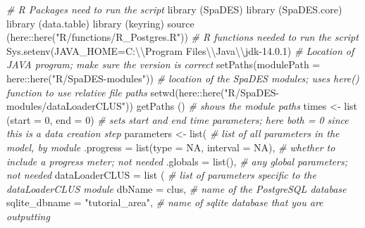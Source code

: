 \documentclass[
]{article}
\newenvironment{Shaded}{\begin{snugshade}}{\end{snugshade}}
\newcommand{\AttributeTok}[1]{\textcolor[rgb]{0.77,0.63,0.00}{#1}}
\newcommand{\CommentTok}[1]{\textcolor[rgb]{0.56,0.35,0.01}{\textit{#1}}}
\newcommand{\ConstantTok}[1]{\textcolor[rgb]{0.00,0.00,0.00}{#1}}
\newcommand{\DecValTok}[1]{\textcolor[rgb]{0.00,0.00,0.81}{#1}}
\newcommand{\FunctionTok}[1]{\textcolor[rgb]{0.00,0.00,0.00}{#1}}
\newcommand{\NormalTok}[1]{#1}
\newcommand{\OtherTok}[1]{\textcolor[rgb]{0.56,0.35,0.01}{#1}}
\newcommand{\SpecialCharTok}[1]{\textcolor[rgb]{0.00,0.00,0.00}{#1}}
\newcommand{\StringTok}[1]{\textcolor[rgb]{0.31,0.60,0.02}{#1}}
\begin{document}
\begin{Shaded}
\begin{Highlighting}[]
\CommentTok{\# R Packages need to run the script}
\FunctionTok{library}\NormalTok{ (SpaDES) }
\FunctionTok{library}\NormalTok{ (SpaDES.core)}
\FunctionTok{library}\NormalTok{ (data.table)}
\FunctionTok{library}\NormalTok{ (keyring)}
\FunctionTok{source}\NormalTok{ (here}\SpecialCharTok{::}\FunctionTok{here}\NormalTok{(}\StringTok{"R/functions/R\_Postgres.R"}\NormalTok{)) }\CommentTok{\# R functions needed to run the script}
\FunctionTok{Sys.setenv}\NormalTok{(}\AttributeTok{JAVA\_HOME=}\StringTok{\textquotesingle{}C:}\SpecialCharTok{\textbackslash{}\textbackslash{}}\StringTok{Program Files}\SpecialCharTok{\textbackslash{}\textbackslash{}}\StringTok{Java}\SpecialCharTok{\textbackslash{}\textbackslash{}}\StringTok{jdk{-}14.0.1\textquotesingle{}}\NormalTok{) }\CommentTok{\# Location of JAVA program; make sure the version is correct}
\FunctionTok{setPaths}\NormalTok{(}\AttributeTok{modulePath =}\NormalTok{ here}\SpecialCharTok{::}\FunctionTok{here}\NormalTok{(}\StringTok{"R/SpaDES{-}modules"}\NormalTok{)) }\CommentTok{\# location of the SpaDES modules; uses here() function to use relative file paths}
\FunctionTok{setwd}\NormalTok{(here}\SpecialCharTok{::}\FunctionTok{here}\NormalTok{(}\StringTok{"R/SpaDES{-}modules/dataLoaderCLUS"}\NormalTok{))}
\FunctionTok{getPaths}\NormalTok{ () }\CommentTok{\# shows the module paths}
\NormalTok{times }\OtherTok{\textless{}{-}} \FunctionTok{list}\NormalTok{ (}\AttributeTok{start =} \DecValTok{0}\NormalTok{, }\AttributeTok{end =} \DecValTok{0}\NormalTok{) }\CommentTok{\# sets start and end time parameters; here both = 0 since this is a data creation step}
\NormalTok{parameters }\OtherTok{\textless{}{-}}  \FunctionTok{list}\NormalTok{( }\CommentTok{\# list of all parameters in the model, by module}
  \AttributeTok{.progress =} \FunctionTok{list}\NormalTok{(}\AttributeTok{type =} \ConstantTok{NA}\NormalTok{, }\AttributeTok{interval =} \ConstantTok{NA}\NormalTok{), }\CommentTok{\# whether to include a progress meter; not needed}
  \AttributeTok{.globals =} \FunctionTok{list}\NormalTok{(), }\CommentTok{\# any global parameters; not needed}
  \AttributeTok{dataLoaderCLUS =} \FunctionTok{list}\NormalTok{ ( }\CommentTok{\# list of parameters specific to the dataLoaderCLUS module  }
                         \AttributeTok{dbName =} \StringTok{\textquotesingle{}clus\textquotesingle{}}\NormalTok{, }\CommentTok{\# name of the PostgreSQL database}
                         \AttributeTok{sqlite\_dbname =} \StringTok{"tutorial\_area"}\NormalTok{, }\CommentTok{\# name of sqlite database that you are outputting}

\end{Highlighting}
\end{Shaded}
\end{document}
